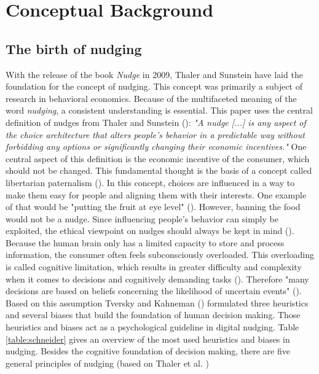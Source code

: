 \section{Conceptual Background}

\subsection{ The birth of nudging}
With the release of the book \textit{Nudge} in 2009, Thaler and Sunstein have laid the foundation for the concept of nudging. This concept was primarily a subject of research in behavioral economics. Because of the multifaceted meaning of the word \textit{nudging}, a consistent understanding is essential. This paper uses the central definition of nudges from Thaler and Sunstein (\citeyear[p.6]{thaler_nudge:_2009}): \textit{"A nudge [...] is any aspect of the choice architecture that alters people's behavior in a predictable way without forbidding any options or significantly changing their economic incentives."}
One central aspect of this definition is the economic incentive of the consumer, which should not be changed. This fundamental thought is the basis of a concept called libertarian paternalism (\cite{thaler_nudge:_2009}). In this concept, choices are influenced in a way to make them easy for people and aligning them with their interests. One example of that would be "putting the fruit at eye level" (\cite[p.6]{thaler_nudge:_2009}). However, banning the food would not be a nudge. Since influencing people's behavior can simply be exploited, the ethical viewpoint on nudges should always be kept in mind (\cite{sunstein_nudging_2015}).
\\

Because the human brain only has a limited capacity to store and process information, the consumer often feels subconsciously overloaded. This overloading is called cognitive limitation, which results in greater difficulty and complexity when it comes to decisions and cognitively demanding tasks (\cite{broniarczyk_decision_2014}). Therefore "many decisions are based on beliefs concerning the likelihood of uncertain events" (\cite[p.1124]{tversky_judgment_1974}). Based on this assumption Tversky and Kahneman (\citeyear{tversky_judgment_1974}) formulated three heuristics and several biases that build the foundation of human decision making. Those heuristics and biases act as a psychological guideline in digital nudging. Table \ref{table:schneider} gives an overview of the most used heuristics and biases in nudging.
Besides the cognitive foundation of decision making, there are five general principles of nudging (based on Thaler et al. \citeyear{thaler_choice_2010})
